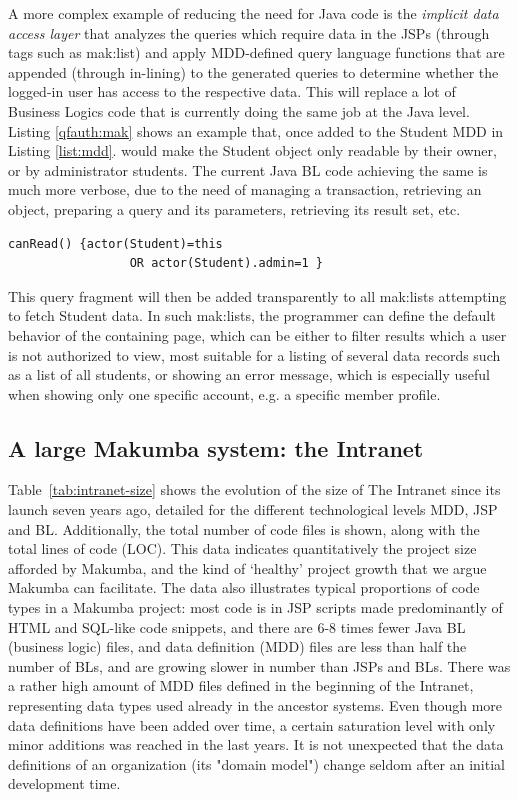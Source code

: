 \documentclass{chi2009}
\begin{document}
A more complex example of reducing the need for Java code is the \textit{implicit data access layer} that analyzes the queries which require data in the JSPs (through tags such as mak:list) and apply MDD-defined query language functions that are appended (through in-lining)  to the generated queries to determine whether the  logged-in user has access to the respective data. This will replace a lot of Business Logics code that is currently doing the same job at the Java level. Listing \ref{qfauth:mak} shows an example that, once added to the Student MDD in Listing \ref{list:mdd}. would make the Student object only readable by their owner, or by administrator students. The current Java BL code achieving the same is much more verbose, due to the need of managing a transaction, retrieving an object, preparing a query and its parameters, retrieving its result set, etc.
\lstset{basicstyle=\small, captionpos=b, caption= query fragment authorization rule, label=qfauth:mak, frame=shadowbox}
\begin{lstlisting}
canRead() {actor(Student)=this 
                 OR actor(Student).admin=1 }
\end{lstlisting}
This query fragment will then be added transparently to all mak:lists attempting to fetch Student data. In such mak:lists, the programmer can define the default behavior of the containing page, which can be either to filter results which a user is not authorized to view, most suitable for a listing of several data records such as a list of all students, or showing an error message, which is especially useful when showing only one specific account, e.g. a specific member profile.



\subsection{A large Makumba system: the Intranet}
Table~\ref{tab:intranet-size} shows the evolution of the size of The Intranet since its launch seven years ago, detailed for the different technological levels MDD, JSP and BL. Additionally, the total number of code files is shown, along with the total lines of code (LOC). This data indicates quantitatively the project size afforded by Makumba, and the kind of `healthy' project growth that we argue Makumba can facilitate. The data also illustrates typical proportions of code types in a Makumba project: most code is in JSP scripts made predominantly of HTML and SQL-like code snippets, and there are 6-8 times fewer Java BL (business logic) files, and data definition (MDD) files are less than half the number of BLs, and are growing slower in number than JSPs and BLs. There was a rather high amount of MDD files defined in the beginning of the Intranet, representing data types used already in the ancestor systems. Even though more data definitions have been added over time, a certain saturation level with only minor additions was reached in the last years. It is not unexpected that the data definitions of an organization (its "domain model") change seldom after an initial development time. 
\end{document}
